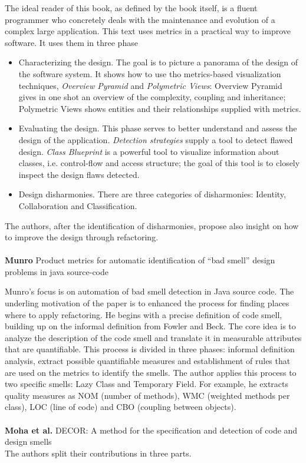 The ideal reader of this book, as defined by the book itself, is a fluent programmer who concretely deals with the maintenance and evolution of a complex large application.
This text uses metrics in a practical way to improve software. It uses them in three phase
\begin{itemize}
    \item Characterizing the design. The goal is to picture a panorama of the design of the software system. It shows how to use tho metrics-based visualization techniques, \emph{Overview Pyramid} and \emph{Polymetric Views}: Overview Pyramid gives in one shot an overview of the complexity, coupling and inheritance; Polymetric Views shows entities and their relationships supplied with metrics.
    \item Evaluating the design. This phase serves to better understand and assess the design of the application. \emph{Detection strategies} \cite{marinescu2004detection} supply a tool to detect flawed design. \emph{Class Blueprint} is a powerful tool to visualize information about classes, i.e. control-flow and access structure; the goal of this tool is to closely inspect the design flaws detected.
    \item Design disharmonies. There are three categories of disharmonies: Identity, Collaboration and Classification. 
\end{itemize}

The authors, after the identification of disharmonies, propose also insight on how to improve the design through refactoring.
\\
\\
\textbf{Munro} \cite{munro2005product} Product metrics for automatic identification of ``bad smell'' design problems in java source-code

Munro's focus is on automation of bad smell detection in Java source code. The underling motivation of the paper is to enhanced the process for finding places where to apply refactoring. He begins with a precise definition of code smell, building up on the informal definition from Fowler and Beck. The core idea is to analyze the description of the code smell and translate it in measurable attributes that are quantifiable. This process is divided in three phases: informal definition analysis, extract possible quantifiable measures and establishment of rules that are used on the metrics to identify the smells. 
The author applies this process to two specific smells: Lazy Class and Temporary Field. For example, he extracts quality measures as NOM (number of methods), WMC (weighted methods per class), LOC (line of code) and CBO (coupling between objects).
\\
\\
\textbf{Moha et al.} \cite{moha2009decor} DECOR: A method for the specification and detection of code and design smells
\\
The authors split their contributions in three parts. 

